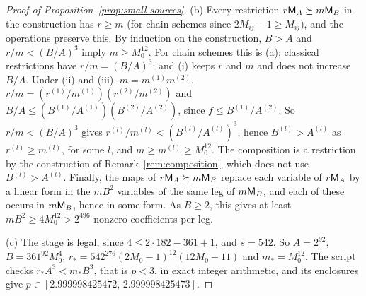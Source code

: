 \begin{proof}[Proof of Proposition~\ref{prop:small-sources}]
(b) Every restriction \(r\mathsf M_A\succeq m\mathsf M_B\) in the construction has
\(r\ge m\) (for chain schemes since \(2M_{ij}-1\ge M_{ij}\)), and the
operations preserve this. By induction on the construction, \(B>A\) and
\(r/m<(B/A)^3\) imply \(m\ge M_0^{12}\). For chain schemes this is (a);
classical restrictions have \(r/m=(B/A)^3\); and (i) keeps \(r\) and
\(m\) and does not increase \(B/A\). Under (ii) and (iii),
\(m=m^{(1)}m^{(2)}\), \(r/m=(r^{(1)}/m^{(1)})(r^{(2)}/m^{(2)})\) and
\(B/A\le(B^{(1)}/A^{(1)})(B^{(2)}/A^{(2)})\), since
\(f\le B^{(1)}/A^{(2)}\). So \(r/m<(B/A)^3\) gives
\(r^{(l)}/m^{(l)}<(B^{(l)}/A^{(l)})^3\), hence \(B^{(l)}>A^{(l)}\) as
\(r^{(l)}\ge m^{(l)}\), for some \(l\), and \(m\ge m^{(l)}\ge M_0^{12}\).
The composition is a restriction by the construction of
Remark~\ref{rem:composition}, which does not use \(B^{(l)}>A^{(l)}\).
Finally, the maps of \(r\mathsf M_A\succeq m\mathsf M_B\) replace each variable of
\(r\mathsf M_A\) by a linear form in the \(mB^2\) variables of the same leg of
\(m\mathsf M_B\), and each of these occurs in \(m\mathsf M_B\), hence in some form.
As \(B\ge2\), this gives at least \(mB^2\ge4M_0^{12}>2^{496}\) nonzero
coefficients per leg.

(c) The stage is legal, since \(4\le2\cdot182-361+1\), and \(s=542\).
So \(A=2^{92}\), \(B=361^{92}M_0^4\),
\(r_*=542^{276}(2M_0-1)^{12}(12M_0-11)\) and \(m_*=M_0^{12}\). The script
checks \(r_*A^3<m_*B^3\), that is \(p<3\), in exact integer arithmetic,
and its enclosures give \(p\in[2.999998425472,\,2.999998425473]\).
\end{proof}
